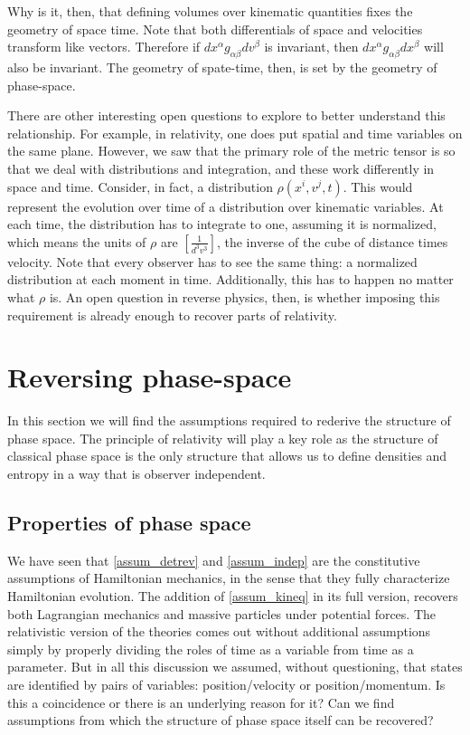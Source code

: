 Why is it, then, that defining volumes over kinematic quantities fixes the geometry of space time. Note that both differentials of space and velocities transform like vectors. Therefore if $dx^\alpha g_{\alpha\beta} dv^\beta$ is invariant, then $dx^\alpha g_{\alpha\beta} dx^\beta$ will also be invariant. The geometry of spate-time, then, is set by the geometry of phase-space.

There are other interesting open questions to explore to better understand this relationship. For example, in relativity, one does put spatial and time variables on the same plane. However, we saw that the primary role of the metric tensor is so that we deal with distributions and integration, and these work differently in space and time. Consider, in fact, a distribution $\rho(x^i, v^j, t)$. This would represent the evolution over time of a distribution over kinematic variables. At each time, the distribution has to integrate to one, assuming it is normalized, which means the units of $\rho$ are $\left[\frac{1}{d^3v^3}\right]$, the inverse of the cube of distance times velocity. Note that every observer has to see the same thing: a normalized distribution at each moment in time. Additionally, this has to happen no matter what $\rho$ is. An open question in reverse physics, then, is whether imposing this requirement is already enough to recover parts of relativity.

\section{Reversing phase-space}

In this section we will find the assumptions required to rederive the structure of phase space. The principle of relativity will play a key role as the structure of classical phase space is the only structure that allows us to define densities and entropy in a way that is observer independent.

\subsection{Properties of phase space}

We have seen that \ref{assum_detrev} and \ref{assum_indep} are the constitutive assumptions of Hamiltonian mechanics, in the sense that they fully characterize Hamiltonian evolution. The addition of \ref{assum_kineq} in its full version, recovers both Lagrangian mechanics and massive particles under potential forces. The relativistic version of the theories comes out without additional assumptions simply by properly dividing the roles of time as a variable from time as a parameter. But in all this discussion we assumed, without questioning, that states are identified by pairs of variables: position/velocity or position/momentum. Is this a coincidence or there is an underlying reason for it? Can we find assumptions from which the structure of phase space itself can be recovered?

